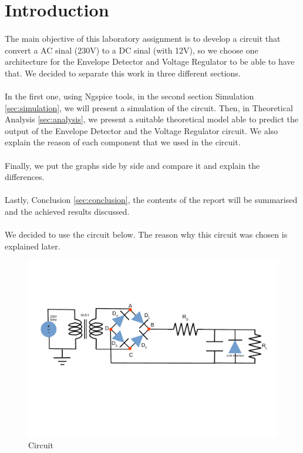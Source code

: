 \newpage
\section{Introduction}
\label{sec:introduction}

\paragraph{} The main objective of this laboratory assignment is to develop a circuit that 
convert a AC sinal (230V) to a DC sinal (with 12V), so we choose one architecture for the Envelope Detector 
and Voltage Regulator to be able to have that.
 We decided to separate this work in three different sections. \paragraph{}
In the first one, using Ngspice tools, in the second section Simulation \ref{sec:simulation}, we will present a 
simulation of the circuit. Then, in Theoretical Analysis \ref{sec:analysis}, we present a suitable theoretical
model able to predict the output of the Envelope Detector and the Voltage Regulator circuit. We also explain 
the reason of each component that we used in the circuit.
\paragraph{}Finally, we put the graphs side by side and compare it and explain the differences.
 \paragraph{}Lastly, Conclusion \ref{sec:conclusion}, the contents of the report will be summarised and the 
achieved results discussed.

\paragraph{} We decided to use the circuit below. The reason why this circuit was chosen is explained later.

\begin{figure}[h]
    \centering
    \includegraphics[width=0.8\linewidth]{circuit.pdf}
    \caption{Circuit}
    \label{fig:circuit}
\end{figure}
